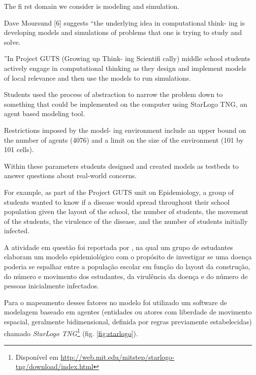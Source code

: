 The fi rst domain we consider is modeling and simulation.

Dave Moursund [6] suggests “the underlying idea in computational think- ing is developing models and simulations of problems that one is trying to study and solve.

”In Project GUTS (Growing up Think- ing Scientifi cally) middle school students actively engage in computational thinking as they design and implement models of local relevance and then use the models to run simulations.

Students used the process of abstraction to narrow the problem down to something that could be implemented on the computer using StarLogo TNG, an agent based modeling tool.

Restrictions imposed by the model- ing environment include an upper bound on the number of agents (4076) and a limit on the size of the environment (101 by 101 cells).

Within these parameters students designed and created models as testbeds to answer questions about real-world concerns.

For example, as part of the Project GUTS unit on Epidemiology, a group of students wanted to know if a disease would spread throughout their school population given the layout of the school, the number of students, the movement of the students, the virulence of the disease, and the number of students initially infected.

A atividade em questão foi reportada por , na qual um grupo de estudantes elaboram um modelo epidemiológico com o propósito de investigar se uma doença poderia se espalhar entre a população escolar em função do layout da construção, do número e movimento dos estudantes, da virulência da doença e do número de pessoas inicialmente infectados.
 
Para o mapeamento desses fatores no modelo foi utilizado um software de modelagem baseado em agentes (entidades ou atores com liberdade de movimento espacial, geralmente bidimensional, definida por regras previamente estabelecidas) chamado \textit{StarLogo TNG}\footnote{Disponível em \href{http://web.mit.edu/mitstep/starlogo-tng/download/index.html}{http://web.mit.edu/mitstep/starlogo-tng/download/index.html}} (fig. \ref{fig:starlogo}).

